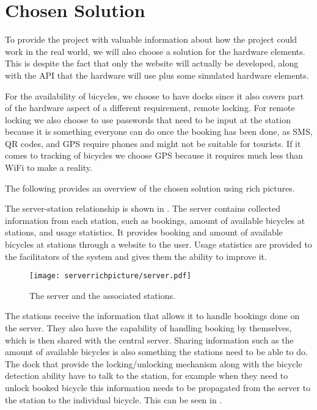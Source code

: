 \section{Chosen Solution}
To provide the project with valuable information about how the project could work in the real world, we will also choose a solution for the hardware elements.
This is despite the fact that only the website will actually be developed, along with the API that the hardware will use plus some simulated hardware elements.

For the availability of bicycles, we choose to have docks since it also covers part of the hardware aspect of a different requirement, remote locking.  
For remote locking we also choose to use passwords that need to be input at the station because it is something everyone can do once the booking has been done, as SMS, QR codes, and GPS require phones and might not be suitable for tourists.
If it comes to tracking of bicycles we choose GPS because it requires much less than WiFi to make a reality.

The following provides an overview of the chosen solution using rich pictures.

The server-station relationship is shown in . 
The server contains collected information from each station, such as bookings, amount of available bicycles at stations, and usage statistics.
It provides booking and amount of available bicycles at stations through a website to the user. 
Usage statistics are provided to the facilitators of the system and gives them the ability to improve it. 

\begin{figure}[h]
\centering
\texttt{[image: serverrichpicture/server.pdf]}
\caption{The server and the associated stations.}
\label{fig:ServerRichPicture}
\end{figure}

The stations receive the information that allows it to handle bookings done on the server.
They also have the capability of handling booking by themselves, which is then shared with the central server.
Sharing information such as the amount of available bicycles is also something the stations need to be able to do.
The dock that provide the locking/unlocking mechanism along with the bicycle detection ability have to talk to the station, for example when they need to unlock booked bicycle this information needs to be propagated from the server to the station to the individual bicycle.
This can be seen in .

